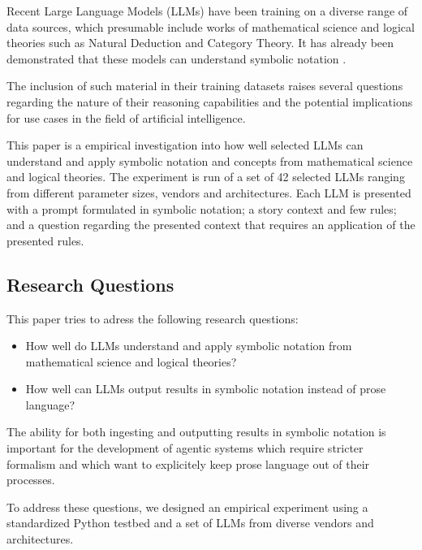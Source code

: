 Recent Large Language Models (LLMs) have been training on a diverse range of data sources, which presumable include works of 
mathematical science and logical theories such as Natural Deduction and Category Theory. It has already been demonstrated
that these models can understand symbolic notation \autocite{vangassen2026}.

The inclusion of such material in their training datasets raises several 
questions regarding the nature of their reasoning capabilities and the potential implications for use cases in the 
field of artificial intelligence.

This paper is a empirical investigation into how well selected LLMs can understand and apply symbolic notation and concepts from mathematical science
and logical theories. The experiment is run of a set of 42 selected LLMs ranging from different parameter sizes, vendors and architectures. 
Each LLM is presented with a prompt formulated in symbolic notation; a story context and few rules; and a question regarding 
the presented context that requires an application of the presented rules. 

\subsection{Research Questions}

This paper tries to adress the following research questions:
\begin{itemize}
    \item How well do LLMs understand and apply symbolic notation from mathematical science and logical theories?
    \item How well can LLMs output results in symbolic notation instead of prose language?
\end{itemize}

The ability for both ingesting and outputting results in symbolic notation is important for the development of 
agentic systems \autocite{ross2026aisp} which require stricter formalism and which want to explicitely keep prose language out of their processes.

To address these questions, we designed an empirical experiment using a standardized Python testbed and a set of LLMs from diverse vendors and architectures.